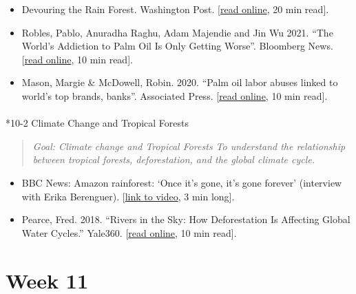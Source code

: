 \documentclass[
  10pt,
  letterpaper,
  oneside,
  open=any]{scrbook}
\makeatletter
\let\oldparagraph\paragraph
\renewcommand{\paragraph}{
    \@ifstar
      \xxxParagraphStar
      \xxxParagraphNoStar
  }
\newcommand{\xxxParagraphStar}[1]{\oldparagraph*{#1}\mbox{}}
\newcommand{\xxxParagraphNoStar}[1]{\oldparagraph{#1}\mbox{}}
\makeatother
\begin{document}
\begin{itemize}
\item
  Devouring the Rain Forest. Washington Post.
  {[}\href{https://www.washingtonpost.com/world/interactive/2022/amazon-beef-deforestation-brazil/}{read
  online}, 20 min read{]}.
\item
  Robles, Pablo, Anuradha Raghu, Adam Majendie and Jin Wu 2021. ``The
  World's Addiction to Palm Oil Is Only Getting Worse''. Bloomberg News.
  {[}\href{https://www.bloomberg.com/graphics/2021-palm-oil-deforestation-climate-change/}{read
  online}, 10 min read{]}.
\item
  Mason, Margie \& McDowell, Robin. 2020. ``Palm oil labor abuses linked
  to world's top brands, banks''. Associated Press.
  {[}\href{https://apnews.com/article/virus-outbreak-only-on-ap-indonesia-financial-markets-malaysia-7b634596270cc6aa7578a062a30423bb}{read
  online}, 10 min read{]}.
\end{itemize}

\paragraph*{10-2 Climate Change and Tropical
Forests}\label{climate-change-and-tropical-forests}

\begin{quote}
\emph{Goal: Climate change and Tropical Forests To understand the
relationship between tropical forests, deforestation, and the global
climate cycle.}
\end{quote}

\begin{itemize}
\item
  BBC News: Amazon rainforest: `Once it's gone, it's gone forever'
  (interview with Erika Berenguer).
  {[}\href{https://www.youtube.com/watch?v=TigV80hwebg}{link to video},
  3 min long{]}.
\item
  Pearce, Fred. 2018. ``Rivers in the Sky: How Deforestation Is
  Affecting Global Water Cycles.'' Yale360.
  {[}\href{https://e360.yale.edu/features/how-deforestation-affecting-global-water-cycles-climate-change}{read
  online}, 10 min read{]}.
\end{itemize}

\section*{Week 11}\label{week-11}
\end{document}
